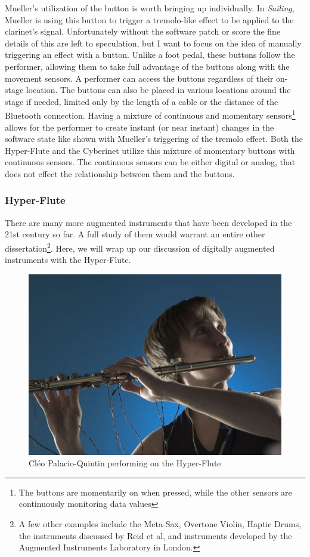 Mueller's utilization of the button is worth bringing up individually. In \textit{Sailing}, Mueller is using this button to trigger a tremolo-like effect to be applied to the clarinet's signal. Unfortunately without the software patch or score the fine details of this are left to speculation, but I want to focus on the idea of manually triggering an effect with a button. Unlike a foot pedal, these buttons follow the performer, allowing them to take full advantage of the buttons along with the movement sensors. A performer can access the buttons regardless of their on-stage location. The buttons can also be placed in various locations around the stage if needed, limited only by the length of a cable or the distance of the Bluetooth connection. Having a mixture of continuous and momentary sensors\footnote{The buttons are momentarily on when pressed, while the other sensors are continuously monitoring data values} allows for the performer to create instant (or near instant) changes in the software state like shown with Mueller's triggering of the tremolo effect. Both the Hyper-Flute and the Cyberinet utilize this mixture of momentary buttons with continuous sensors. The continuous sensors can be either digital or analog, that does not effect the relationship between them and the buttons.


\subsubsection{Hyper-Flute}

There are many more augmented instruments that have been developed in the 21st century so far. A full study of them would warrant an entire other dissertation\footnote{A few other examples include the Meta-Sax, Overtone Violin, Haptic Drums, the instruments discussed by Reid et al\cite{reid2018}, and instruments developed by the Augmented Instruments Laboratory in London.}. Here, we will wrap up our discussion of digitally augmented instruments with the Hyper-Flute.

\begin{figure}
    \centering
    \includegraphics[scale=0.5]{diagrams/palacio_quintin_cleo.jpg}
    \caption{Cléo Palacio-Quintin performing on the Hyper-Flute}
    \label{fig:hyper-flute}
\end{figure}

